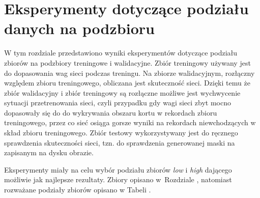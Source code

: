 \section{Eksperymenty dotyczące podziału danych na podzbioru}
\label{sec:podzial_eksperyment}

W tym rozdziale przedstawiono wyniki eksperymentów dotyczące podziału zbiorów na podzbiory treningowe i walidacyjne.
Zbiór treningowy używany jest do dopasowania wag sieci podczas treningu.
Na zbiorze walidacyjnym, rozłączny względem zbioru treningowego, obliczana jest skuteczność sieci.
Dzięki temu że zbiór walidacyjny i zbiór treningowy są rozłączne możliwe jest wychwycenie sytuacji przetrenowania sieci, czyli przypadku gdy wagi sieci zbyt mocno dopasowały się do do wykrywania obszaru kortu w rekordach zbioru treningowego, przez co sieć osiąga gorsze wyniki na rekordach niewchodzących w skład zbioru treningowego.
Zbiór testowy wykorzystywany jest do ręcznego sprawdzenia skuteczności sieci, tzn. do sprawdzenia generowanej maski na zapisanym na dysku obrazie.

Eksperymenty miały na celu wybór podziału zbiorów \textit{low} i \textit{high} dającego możliwie jak najlepsze rezultaty. Zbiory opisano w~Rozdziale , natomiast rozważane podziały zbiorów opisano w Tabeli .
